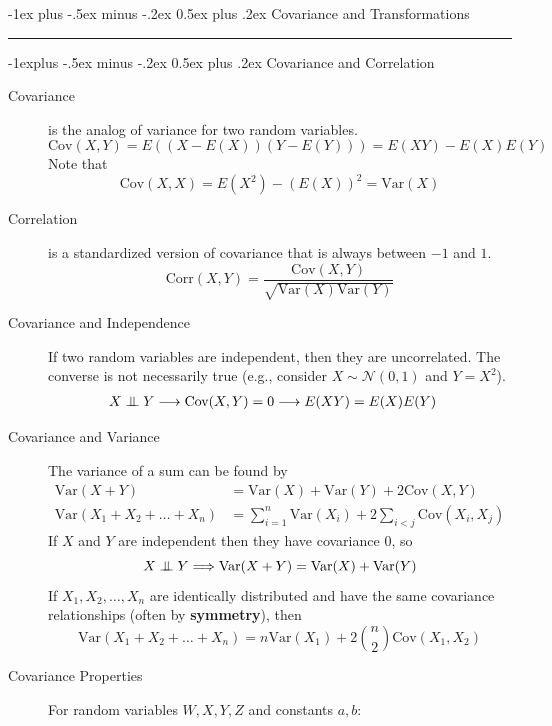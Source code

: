 \documentclass[10pt,landscape]{article}
\makeatletter
\newcommand\independent{\protect\mathpalette{\protect\independenT}{\perp}}
\def\independenT#1#2{\mathrel{\setbox0\hbox{$#1#2$}%
    \copy0\kern-\wd0\mkern4mu\box0}}
\newcommand{\var}{\textrm{Var}}
\newcommand{\cov}{\textrm{Cov}}
\newcommand{\corr}{\textrm{Corr}}
\newcommand{\N}{\mathcal{N}}
\renewcommand{\section}{\@startsection{section}{1}{0mm}%
                                {-1ex plus -.5ex minus -.2ex}%
                                {0.5ex plus .2ex}%
                                {\normalfont\large\bfseries}}
\renewcommand{\subsection}{\@startsection{subsection}{2}{0mm}%
                                {-1explus -.5ex minus -.2ex}%
                                {0.5ex plus .2ex}%
                                {\normalfont\normalsize\bfseries}}
\makeatother
\begin{document}
\begin{multicols*}{3}
    \section{Covariance and Transformations}\smallskip \hrule height 2pt \smallskip
    \subsection{Covariance and Correlation}
    \begin{description}
        \item [Covariance] is the analog of variance for two random variables.
        \[\cov(X, Y) = E\left((X - E(X))(Y - E(Y))\right) = E(XY) - E(X)E(Y)\]
        Note that 
        \[\cov(X, X) = E(X^2) - (E(X))^2 =  \var(X)\]
        \item [Correlation] is a standardized version of covariance that is always between $-1$ and $1$.
        \[\corr(X, Y) = \frac{\cov(X, Y)}{\sqrt{\var(X)\var(Y)}} \]
        \item [Covariance and Independence] If two random variables are independent, then they are uncorrelated. The converse is not necessarily true (e.g., consider $X \sim \N(0,1)$ and $Y=X^2$).
        \begin{align*}
            X \independent Y & \longrightarrow \cov(X, Y) = 0 \longrightarrow E(XY) = E(X)E(Y) 
        \end{align*}
        \item [Covariance and Variance]  The variance of a sum can be found by
        \begin{align*}
            \var(X + Y)                    & = \var(X) + \var(Y) + 2\cov(X, Y)                          \\
            \var(X_1 + X_2 + \dots + X_n ) & = \sum_{i = 1}^{n}\var(X_i) + 2\sum_{i < j} \cov(X_i, X_j) 
        \end{align*}
        If $X$ and $Y$ are independent then they have covariance $0$, so
        \[X \independent Y \Longrightarrow \var(X + Y) = \var(X) + \var(Y)\]
        If $X_1, X_2, \dots, X_n$ are identically distributed and have the same covariance relationships (often by \textbf{symmetry}), then 
        \[\var(X_1 + X_2 + \dots + X_n ) = n\var(X_1) + 2{n \choose 2}\cov(X_1, X_2)\]
        \item [Covariance Properties]  For random variables $W, X, Y, Z$ and constants $a, b$:

\end{description}
\end{multicols*}
\end{document}
